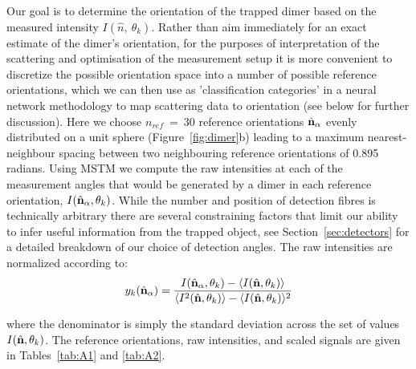 Our goal is to determine the orientation of the trapped dimer based on the measured 
intensity $I(\hat{n}, \ \theta_k)$. Rather than aim immediately for an exact estimate 
of the dimer's orientation, for the purposes of interpretation of the scattering and 
optimisation of the measurement setup it is more convenient to discretize the possible orientation space into a number of possible reference orientations, which we can then 
use as 'classification categories' in a neural network methodology to map scattering 
data to orientation (see below for further discussion).  Here we choose $\textit{n}_{ref} 
\ = \ 30$ reference orientations $\hat{\bf n}_{\alpha}$  evenly distributed on a 
unit sphere \cite{Reyuthor2006} (Figure~\ref{fig:dimer}b) leading to a maximum 
nearest-neighbour spacing between two neighbouring reference orientations of 0.895 
radians. Using MSTM we compute the raw intensities at each of the measurement angles 
that would be generated by a dimer in each reference orientation, $I(\hat{\bf n}_{\alpha}, \theta_k)$. While the number and position of detection fibres is technically arbitrary 
there are several constraining factors that limit our ability to infer useful information 
from the trapped object, see Section~\ref{sec:detectors} for a detailed breakdown 
of our choice of detection angles. The raw intensities are normalized according to:
\begin{align}
	\label{eq:scale}
	y_k(\hat{\bf n}_\alpha)
	= 
	\frac{I(\hat{\bf n}_\alpha, \theta_k) - \langle I(\hat{\bf n},\theta_k) \rangle } 
	{\langle I^2(\hat{\bf n},\theta_k) \rangle -\langle I(\hat{\bf n}, \theta_k)\rangle^2}
\end{align}

where the denominator is simply the standard deviation across the set of values
$I(\hat{\bf n}, \theta_k)$. The reference orientations, raw intensities, and scaled 
signals are given in Tables~\ref{tab:A1} and \ref{tab:A2}. 

